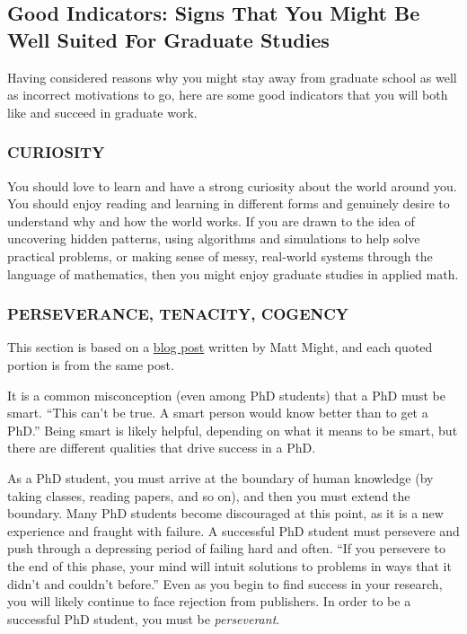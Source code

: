 \documentclass[11pt]{article}
\begin{document}
\subsection{Good Indicators: Signs That You Might Be Well Suited For Graduate Studies}
Having considered reasons why you might stay away from graduate school as well as incorrect motivations to go, here are some good indicators that you will both like and succeed in graduate work.

\subsubsection*{CURIOSITY}
You should love to learn and have a strong curiosity about the world around you. You should enjoy reading and learning in different forms and genuinely desire to understand why and how the world works. If you are drawn to the idea of uncovering hidden patterns, using algorithms and simulations to help solve practical problems, or making sense of messy, real-world systems through the language of mathematics, then you might enjoy graduate studies in applied math.

\subsubsection*{PERSEVERANCE, TENACITY, COGENCY}
This section is based on a \href{https://matt.might.net/articles/successful-phd-students/}{blog post} written by Matt Might, and each quoted portion is from the same post.

It is a common misconception (even among PhD students) that a PhD must be smart. ``This can't be true. A smart person would know better than to get a PhD.'' Being smart is likely helpful, depending on what it means to be smart, but there are different qualities that drive success in a PhD.

As a PhD student, you must arrive at the boundary of human knowledge (by taking classes, reading papers, and so on), and then you must extend the boundary. Many PhD students become discouraged at this point, as it is a new experience and fraught with failure. A successful PhD student must persevere and push through a depressing period of failing hard and often. ``If you persevere to the end of this phase, your mind will intuit solutions to problems in ways that it didn't and couldn't before.'' Even as you begin to find success in your research, you will likely continue to face rejection from publishers. In order to be a successful PhD student, you must be \emph{perseverant}.
\end{document}
